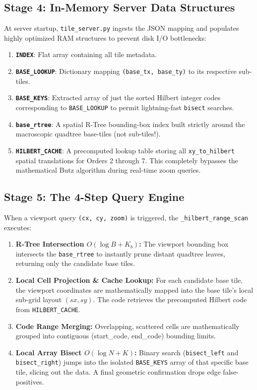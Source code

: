 \documentclass[12pt,a4paper]{article}
\begin{document}
\subsection{Stage 4: In-Memory Server Data Structures}
At server startup, \texttt{tile\_server.py} ingests the JSON mapping and populates highly optimized RAM structures to prevent disk I/O bottlenecks:
\begin{enumerate}
    \item \textbf{\texttt{INDEX}}: Flat array containing all tile metadata.
    \item \textbf{\texttt{BASE\_LOOKUP}}: Dictionary mapping \texttt{(base\_tx, base\_ty)} to its respective sub-tiles.
    \item \textbf{\texttt{BASE\_KEYS}}: Extracted array of just the sorted Hilbert integer codes corresponding to \texttt{BASE\_LOOKUP} to permit lightning-fast \texttt{bisect} searches.
    \item \textbf{\texttt{base\_rtree}}: A spatial R-Tree bounding-box index built strictly around the macroscopic quadtree base-tiles (not sub-tiles!).
    \item \textbf{\texttt{HILBERT\_CACHE}}: A precomputed lookup table storing all \texttt{xy\_to\_hilbert} spatial translations for Orders 2 through 7. This completely bypasses the mathematical Butz algorithm during real-time zoom queries.
\end{enumerate}

\subsection{Stage 5: The 4-Step Query Engine}
When a viewport query \texttt{(cx, cy, zoom)} is triggered, the \texttt{\_hilbert\_range\_scan} executes:
\begin{enumerate}
    \item \textbf{R-Tree Intersection $O(\log B + K_b)$:} The viewport bounding box intersects the \texttt{base\_rtree} to instantly prune distant quadtree leaves, returning only the candidate base tiles.
    \item \textbf{Local Cell Projection \& Cache Lookup:} For each candidate base tile, the viewport coordinates are mathematically mapped into the base tile's local sub-grid layout $(sx, sy)$. The code retrieves the precomputed Hilbert code from \texttt{HILBERT\_CACHE}.
    \item \textbf{Code Range Merging:} Overlapping, scattered cells are mathematically grouped into contiguous (start\_code, end\_code) bounding limits.
    \item \textbf{Local Array Bisect $O(\log N + K)$:} Binary search (\texttt{bisect\_left} and \texttt{bisect\_right}) jumps into the isolated \texttt{BASE\_KEYS} array of that specific base tile, slicing out the data. A final geometric confirmation drops edge false-positives.
\end{enumerate}
\end{document}
